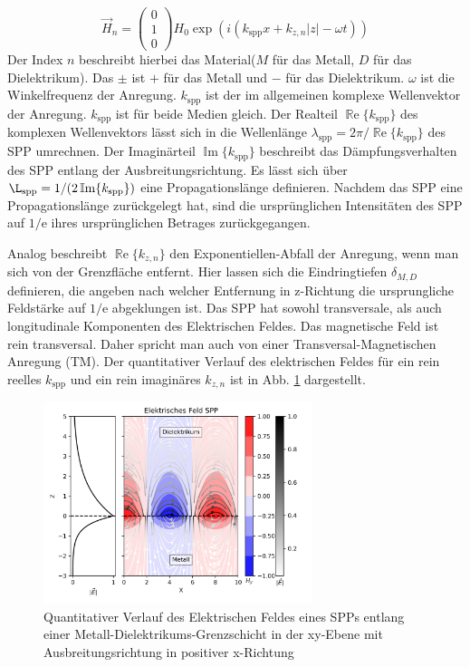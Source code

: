 \documentclass{article}
\begin{document}
	\begin{equation}
		\label{eq:magnetic_field_spp}
		\vec{H}_n = \begin{pmatrix} 0 \\ 1 \\ 0 \end{pmatrix} H_0 \exp\left(i(k_{\mathrm{spp}}x + k_{z, n}|z|-\omega t)\right)
	\end{equation}
	Der Index $n$ beschreibt hierbei das Material($M$ für das Metall, $D$ für das Dielektrikum). Das $\pm$ ist $+$ für das Metall und  $-$ für das Dielektrikum. $\omega$ ist die Winkelfrequenz der Anregung. $k_{\mathrm{spp}}$ ist der im allgemeinen komplexe Wellenvektor der Anregung.  $k_{\mathrm{spp}}$ ist für beide Medien gleich. Der Realteil $\operatorname{\mathbb{R}e}\{k_{\mathrm{spp}}\}$ des komplexen Wellenvektors lässt sich in die Wellenlänge $\lambda_{\mathrm{spp}} = 2\pi/ \operatorname{\mathbb{R}e}\{k_{\mathrm{spp}}\} $ des SPP umrechnen. Der Imaginärteil $\operatorname{\mathbb{I}m}\{k_{\mathrm{spp}}\}$ beschreibt das Dämpfungsverhalten des SPP entlang der Ausbreitungsrichtung. Es lässt sich über $\L_{\mathrm{spp}} = 1/(2\operatorname{\mathbb{I}m}\{k_{\mathrm{spp}}\})$ eine Propagationslänge definieren. Nachdem das SPP eine Propagationslänge zurückgelegt hat, sind die ursprünglichen Intensitäten des SPP auf $1/\mathrm{e}$ ihres ursprünglichen Betrages zurückgegangen.
	
	Analog beschreibt $\operatorname{\mathbb{R}e}\{k_{z, n}\}$ den Exponentiellen-Abfall der Anregung, wenn man sich von der Grenzfläche entfernt. Hier lassen sich die Eindringtiefen $\delta_{M,D}$ definieren, die angeben nach welcher Entfernung in z-Richtung die ursprungliche Feldstärke auf $1/\mathrm{e}$ abgeklungen ist. Das SPP hat sowohl transversale, als auch longitudinale Komponenten des Elektrischen Feldes. Das magnetische Feld ist rein transversal. Daher spricht man auch von einer Transversal-Magnetischen Anregung (TM).
	Der quantitativer Verlauf des elektrischen Feldes für ein rein reelles $k_{\mathrm{spp}}$ und ein rein imaginäres $k_{z, n}$ ist in Abb. \ref{fig:electric_field_spp} dargestellt.
	\begin{figure}[htbp] 
		\centering
		\includegraphics[width=0.7\textwidth]{figures/E_Feld_SPP.png}
		\caption{Quantitativer Verlauf des Elektrischen Feldes eines SPPs entlang einer Metall-Dielektrikums-Grenzschicht in der  xy-Ebene mit Ausbreitungsrichtung in positiver x-Richtung}
		\label{fig:electric_field_spp}
	\end{figure}
\end{document}
